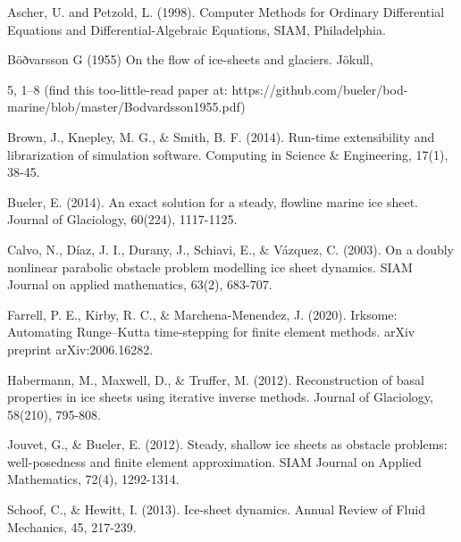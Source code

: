 \documentclass{article}
\theoremstyle{definition}
\theoremstyle{plain}
\begin{document}
Ascher, U. and Petzold, L. (1998). Computer Methods for Ordinary Differential Equations and Differential-Algebraic Equations, SIAM, Philadelphia.

Böðvarsson G (1955) On the flow of ice-sheets and glaciers. Jökull,

5, 1–8 (find this too-little-read paper at: https://github.com/bueler/bod-marine/blob/master/Bodvardsson1955.pdf)

Brown, J., Knepley, M. G., \& Smith, B. F. (2014). Run-time extensibility and librarization of simulation software. Computing in Science \& Engineering, 17(1), 38-45.

Bueler, E. (2014). An exact solution for a steady, flowline marine ice sheet. Journal of Glaciology, 60(224), 1117-1125.

Calvo, N., Díaz, J. I., Durany, J., Schiavi, E., \& Vázquez, C. (2003). On a doubly nonlinear parabolic obstacle problem modelling ice sheet dynamics. SIAM Journal on applied mathematics, 63(2), 683-707.

Farrell, P. E., Kirby, R. C., \& Marchena-Menendez, J. (2020). Irksome: Automating Runge--Kutta time-stepping for finite element methods. arXiv preprint arXiv:2006.16282.

Habermann, M., Maxwell, D., \& Truffer, M. (2012). Reconstruction of basal properties in ice sheets using iterative inverse methods. Journal of Glaciology, 58(210), 795-808.

Jouvet, G., \& Bueler, E. (2012). Steady, shallow ice sheets as obstacle problems: well-posedness and finite element approximation. SIAM Journal on Applied Mathematics, 72(4), 1292-1314.

Schoof, C., \& Hewitt, I. (2013). Ice-sheet dynamics. Annual Review of Fluid Mechanics, 45, 217-239.
\end{document}
